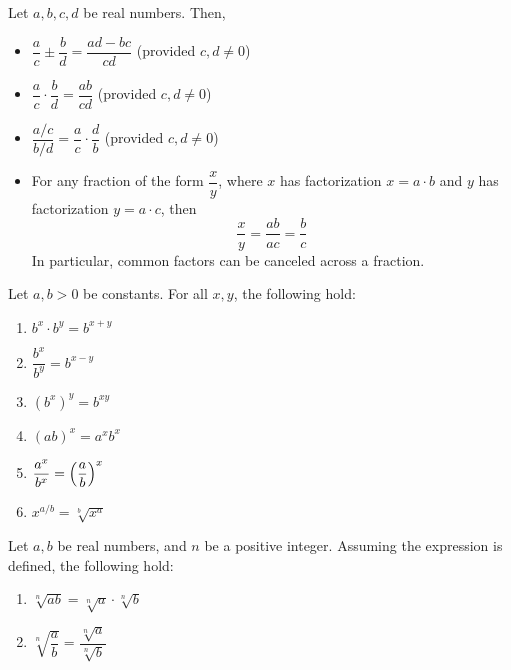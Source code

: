 \documentclass[notes]{subfiles}
\begin{document}
		\begin{rmk}
			Let \(a,b,c,d\) be real numbers. Then, \\[5pt]
			\begin{itemize}
				\item \(\dfrac{a}{c} \pm \dfrac{b}{d} = \dfrac{ad - bc}{cd}\) (provided \(c,d\neq 0\))
				\item \(\dfrac{a}{c}\cdot \dfrac{b}{d} = \dfrac{ab}{cd}\) (provided \(c,d\neq 0\))
				\item \(\dfrac{a/c}{b/d} = \dfrac{a}{c}\cdot \dfrac{d}{b}\) (provided \(c,d\neq 0\))
				\item For any fraction of the form \(\dfrac{x}{y}\), where \(x\) has factorization \(x = a\cdot b\) and \(y\) has factorization \(y = a\cdot c\), then
					\[\dfrac{x}{y} = \dfrac{ab}{ac} = \dfrac{b}{c}\]
					In particular, common factors can be canceled across a fraction.			
			\end{itemize}
		\end{rmk}
		\begin{rmk}
			Let \(a,b >0\) be constants. For all \(x,y\), the following hold:\\[5pt]
			\begin{enumerate}
				\setlength{\itemsep}{10pt}
				\item \(b^x\cdot b^y = b^{x+y}\)
				\item \(\dfrac{b^x}{b^y} = b^{x-y}\)
				\item \((b^x)^y = b^{xy}\)
				\item \((ab)^x = a^xb^x\)
				\item \(\dfrac{a^x}{b^x} = \left( \dfrac{a}{b}\right)^x\)
				\item \(x^{a/b} = \sqrt[b]{x^a}\)
			\end{enumerate}
		\end{rmk}	
		
		\begin{rmk}
			Let \(a,b\) be real numbers, and \(n\) be a positive integer. Assuming the expression is defined, the following hold:
			\begin{enumerate}
				\setlength{\itemsep}{10pt}
				\item \(\sqrt[n]{ab} = \sqrt[n]{a}\cdot \sqrt[n]{b}\)
				\item \(\sqrt[n]{\dfrac{a}{b}} = \dfrac{\sqrt[n]{a}}{\sqrt[n]{b}}\)
			\end{enumerate}
		\end{rmk}
		
\end{document}
